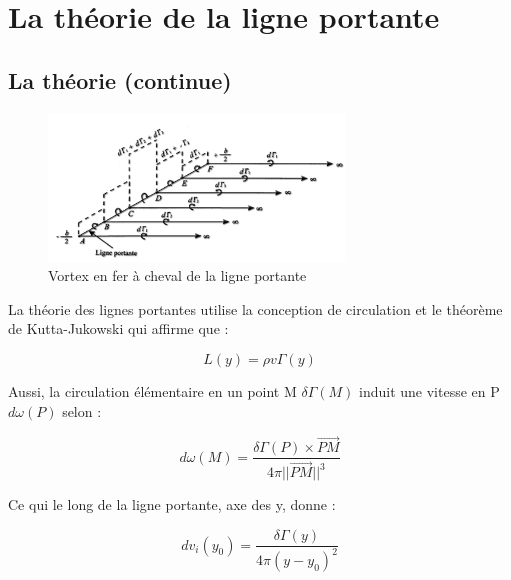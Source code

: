 \chapter{La théorie de la ligne portante}
\label{ch:Ch1}

\section{La théorie (continue)} 
\label{sec:Ch1.1}

\begin{figure}[H]
    \centering
    \includegraphics[width=0.7\textwidth]{Pics/01 - Basses Fidélités/Ligne portante.png}  
    \caption{Vortex en fer à cheval de la ligne portante}
    \label{fig:llt fer à cheval}
\end{figure}

La théorie des lignes portantes utilise la conception de circulation et le théorème de Kutta-Jukowski qui affirme que :

\begin{center}
    \begin{equation}
        L(y) = \rho v \Gamma(y)
        \label{eq:Cl_breukels}
    \end{equation}
\end{center}

Aussi, la circulation élémentaire en un point M $\delta\Gamma(M) $ induit une vitesse en P $d\omega(P) $ selon : 

\begin{center}
    \begin{equation}
        d\omega(M) = \frac{\delta\Gamma(P) \times \overrightarrow{PM}}{4\pi ||\overrightarrow{PM}||^3}
        \label{eq:v induite}
    \end{equation}
\end{center}

Ce qui le long de la ligne portante, axe des y, donne : 

\begin{center}
    \begin{equation}
        dv_i(y_0) = \frac{\delta\Gamma(y)}{4\pi (y-y_0)^2}
        \label{eq:v induite 1d}
    \end{equation}
\end{center}

